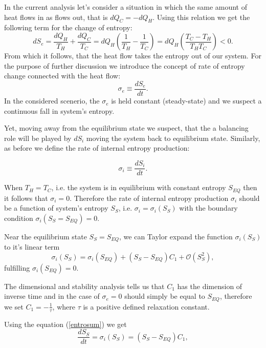 \documentclass[a4paper,12pt]{article}
\begin{document}
In the current analysis let's consider a situation in which the same amount of heat flows in as flows out, that is $dQ_C=-dQ_H$. Using this relation we get the following term for the change of entropy:
\begin{equation}
dS_e=\frac{dQ_H}{T_H}+\frac{dQ_C}{T_C}=dQ_H\left(\frac{1}{T_H}-\frac{1}{T_C}\right)
=dQ_H\left(\frac{T_C-T_H}{T_HT_C}\right)<0.
\label{dSe1}
\end{equation}
From which it follows, that the heat flow takes the entropy out of our system.
For the purpose of further discussion we introduce the concept of rate of entropy change connected with the heat flow:
\begin{equation}
\sigma_e \equiv  \frac{dS_e}{dt}. 
\end{equation}
In the considered scenerio, the $\sigma_e$ is held constant (steady-state) and we suspect a continuous fall in system's entropy.

Yet, moving away from the equilibrium state we suspect, that the a balancing role will be played by $dS_i$ moving the system back to equilibrium state. Similarly, as before we define the rate of internal entropy production:

\begin{equation}
\sigma_i \equiv \frac{dS_i}{dt}.   
\end{equation} 

When $T_H=T_C$, i.e. the system is in equilibrium with constant entropy $S_{EQ}$ then it follows that $\sigma_i=0$.
Therefore the rate of internal entropy production $\sigma_i$ should be a function  of system's entropy $S_S$, i.e. $\sigma_i = \sigma_i(S_S)$ with the boundary condition $\sigma_i(S_S=S_{EQ})=0$. 

Near the equilibrium state $S_S=S_{EQ}$, we can Taylor expand the function $\sigma_i(S_S)$ to it's linear term
\begin{equation}
\sigma_i(S_S)=\sigma_i\left(S_{EQ}\right)+\left(S_S-S_{EQ}\right)C_1+\mathcal{O}\left(S_S^2\right),
\end{equation} 
fulfilling $\sigma_i\left(S_{EQ}\right)=0$. 

The dimensional and stability analysis tells us that $C_1$ has the dimension of inverse time and in the case of 
$\sigma_e=0$ should simply be equal to $S_{EQ}$, therefore we set $C_1 = -\frac{1}{\tau}$, where $\tau$ is a positive defined relaxation constant.

Using the equation (\ref{entrosum}) we get
\begin{equation}
\frac{dS_S}{dt}=\sigma_i\left(S_S\right)=\left(S_S-S_{EQ}\right)C_1, 
\label{stab}
\end{equation} 
\end{document}

